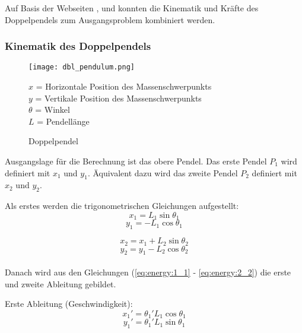 \documentclass[12pt]{article}
\numberwithin{equation}{subsection}
\begin{document}
Auf Basis der Webseiten \citep{neumann04}, \citep{kramann11} und \citep{weissstein07} konnten die Kinematik und Kräfte des Doppelpendels zum Ausgangsproblem kombiniert werden. 

\subsubsection{Kinematik des Doppelpendels}
\begin{figure}[H]
	\begin{minipage}[!b]{0.4\textwidth}
		\centering
		\texttt{[image: dbl\_pendulum.png]}
		\caption[Doppelpendel]{Doppelpendel \citep{neumann04}}
		\label{fig:energy}
	\end{minipage}
	\begin{minipage}[!t]{\textwidth}
		\vspace{0pt}\raggedright
		$x$ = Horizontale Position des Massenschwerpunkts\\
		$y$ = Vertikale Position des Massenschwerpunkts\\
		$\theta$ = Winkel\\
		$L$ = Pendellänge
	\end{minipage}
\end{figure}

Ausgangslage für die Berechnung ist das obere Pendel. Das erste Pendel $P_1$ wird definiert mit $x_1$ und $y_1$. Äquivalent dazu wird das zweite Pendel $P_2$ definiert mit $x_2$ und $y_2$.

Als erstes werden die trigonometrischen Gleichungen aufgestellt:
\begin{equation} \label{eq:energy:1_1}
	x_1 = L_1\sin\theta_1
\end{equation}
\begin{equation} \label{eq:energy:1_2}
	y_1 = -L_1\cos\theta_1
\end{equation}

\begin{equation} \label{eq:energy:2_1}
	x_2 = x_1 + L_2\sin\theta_2
\end{equation}
\begin{equation} \label{eq:energy:2_2}
	y_2 = y_1 - L_2\cos\theta_2
\end{equation}
\
\\
Danach wird aus den Gleichungen (\ref{eq:energy:1_1} - \ref{eq:energy:2_2}) die erste und zweite Ableitung gebildet.

Erste Ableitung (Geschwindigkeit):
\begin{equation} \label{eq:velocity:1_1}
	x_1' = \theta_1' L_1\cos\theta_1
\end{equation}
\begin{equation} \label{eq:velocity:1_2}
	y_1' = \theta_1' L_1\sin\theta_1
\end{equation}
\end{document}
